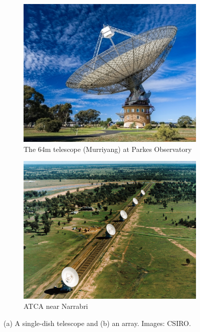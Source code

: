         \begin{figure}
            \centering
            \begin{subfigure}{0.45\textwidth}
                \includegraphics[width=\textwidth]{images/CSIRO-Parkes-Wiradjuri-naming-Murriyang.jpg}
                \caption{The 64m telescope (Murriyang) \linebreak at Parkes Observatory}
                \label{fig:murriyang}
            \end{subfigure}
            \begin{subfigure}{0.45\textwidth}
                \includegraphics[width=\textwidth]{images/atca.jpg}
                \caption{ATCA near Narrabri\\\phantom{a}}
                \label{fig:atca}
            \end{subfigure}
            \caption[A single dish telescope and a radio array.]{\label{fig:telescopes} (a) A single-dish telescope and (b) an array. Images: CSIRO.}
        \end{figure}

